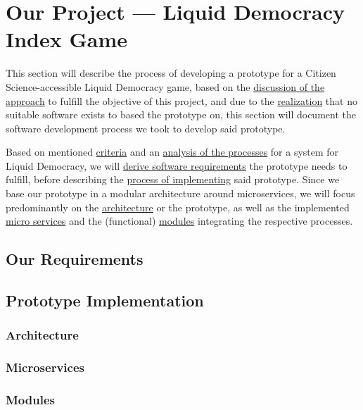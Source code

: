 \chapter{Our Project — Liquid Democracy Index Game}
\label{ch:ProjectRequirements}


This section will describe the process of developing a prototype for a Citizen Science-accessible Liquid Democracy game, based on the \href{sec:Approach}{discussion of the approach} to fulfill the objective of this project, and due to the \href{sec:DiscussionRW}{realization} that no suitable software exists to based the prototype on, this section will document the software development process we took to develop said prototype.

Based on mentioned \href{sec:Criteria}{criteria} and an \href{sec:AnalysisProcesses}{analysis of the processes} for a system for Liquid Democracy, we will \href{sec:SoftwareRequirements}{derive software requirements} the prototype needs to fulfill, before describing the \href{sec:Implementation}{process of implementing} said prototype. Since we base our prototype in a modular architecture around microservices, we will focus predominantly on the \href{ssec:Architecture}{architecture} or the prototype, as well as the implemented \href{ssec:Microservices}{micro services} and the (functional) \href{ssec:Modules}{modules} integrating the respective processes. 

\section{Our Requirements}
\label{sec:SoftwareRequirements}
\section{Prototype Implementation}
\label{sec:Implementation}
\subsection{Architecture}
\label{ssec:Architecture}
\subsection{Microservices}
\label{ssec:Microservices}
\subsection{Modules}
\label{ssec:Modules}